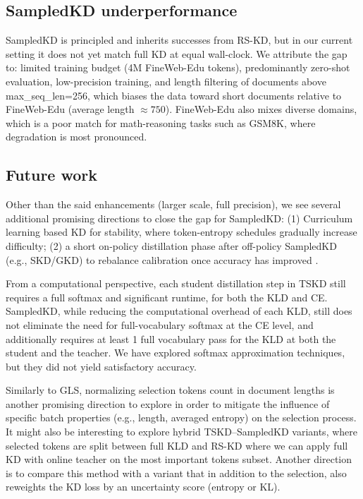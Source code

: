 \documentclass[11pt]{article}
\begin{document}
\subsection{SampledKD underperformance}
SampledKD is principled and inherits successes from RS-KD, but in our current setting it does not yet match full KD at equal wall-clock.
We attribute the gap to: limited training budget (4M FineWeb-Edu tokens), predominantly zero-shot evaluation, low-precision training, and length filtering of documents above max\_seq\_len=256, which biases the data toward short documents relative to FineWeb-Edu (average length $\approx750$).
FineWeb-Edu also mixes diverse domains, which is a poor match for math-reasoning tasks such as GSM8K, where degradation is most pronounced.

\subsection{Future work}
Other than the said enhancements (larger scale, full precision), we see several additional promising directions to close the gap for SampledKD:
(1) Curriculum learning based KD for stability, where token-entropy schedules gradually increase difficulty;
(2) a short on-policy distillation phase after off-policy SampledKD (e.g., SKD/GKD) to rebalance calibration once accuracy has improved \citep{xu2024speculative}.

From a computational perspective, each student distillation step in TSKD still requires a full softmax and significant runtime, for both the KLD and CE.
SampledKD, while reducing the computational overhead of each KLD, still does not eliminate the need for full-vocabulary softmax at the CE level, and additionally requires at least 1 full vocabulary pass for the KLD at both the student and the teacher.
We have explored softmax approximation techniques, but they did not yield satisfactory accuracy.

Similarly to GLS, normalizing selection tokens count in document lengths is another promising direction to explore in order to mitigate the influence of specific batch properties (e.g., length, averaged entropy) on the selection process.
It might also be interesting to explore hybrid TSKD--SampledKD variants, where selected tokens are split between full KLD and RS-KD where we can apply full KD with online teacher on the most important tokens subset.
Another direction is to compare this method with a variant that in addition to the selection, also reweights the KD loss by an uncertainty score (entropy or KL).
\end{document}
